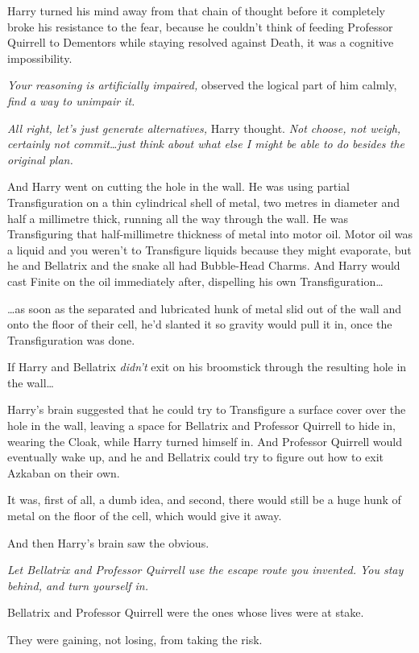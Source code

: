 Harry turned his mind away from that chain of thought before it completely broke his resistance to the fear, because he couldn’t think of feeding Professor Quirrell to Dementors while staying resolved against Death, it was a cognitive impossibility.

\emph{Your reasoning is artificially impaired,} observed the logical part of him calmly, \emph{find a way to unimpair it.}

\emph{All right, let’s just generate alternatives,} Harry thought. \emph{Not choose, not weigh, certainly not commit…just think about what else I might be able to do besides the original plan.}

And Harry went on cutting the hole in the wall. He was using partial Transfiguration on a thin cylindrical shell of metal, two metres in diameter and half a millimetre thick, running all the way through the wall. He was Transfiguring that half-millimetre thickness of metal into motor oil. Motor oil was a liquid and you weren’t to Transfigure liquids because they might evaporate, but he and Bellatrix and the snake all had Bubble-Head Charms. And Harry would cast Finite on the oil immediately after, dispelling his own Transfiguration…

…as soon as the separated and lubricated hunk of metal slid out of the wall and onto the floor of their cell, he’d slanted it so gravity would pull it in, once the Transfiguration was done.

If Harry and Bellatrix \emph{didn’t} exit on his broomstick through the resulting hole in the wall…

Harry’s brain suggested that he could try to Transfigure a surface cover over the hole in the wall, leaving a space for Bellatrix and Professor Quirrell to hide in, wearing the Cloak, while Harry turned himself in. And Professor Quirrell would eventually wake up, and he and Bellatrix could try to figure out how to exit Azkaban on their own.

It was, first of all, a dumb idea, and second, there would still be a huge hunk of metal on the floor of the cell, which would give it away.

And then Harry’s brain saw the obvious.

\emph{Let Bellatrix and Professor Quirrell use the escape route you invented. You stay behind, and turn yourself in.}

Bellatrix and Professor Quirrell were the ones whose lives were at stake.

They were gaining, not losing, from taking the risk.

